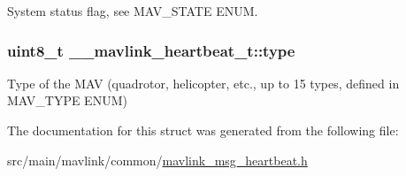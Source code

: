 System status flag, see M\+A\+V\+\_\+\+S\+T\+A\+T\+E E\+N\+U\+M. 

\hypertarget{struct____mavlink__heartbeat__t_a2f34a5f641022acd59d9b54e69976341}{
\subsubsection[{type}]{\setlength{\rightskip}{0pt plus 5cm}uint8\+\_\+t \+\_\+\+\_\+mavlink\+\_\+heartbeat\+\_\+t\+::type}}\label{struct____mavlink__heartbeat__t_a2f34a5f641022acd59d9b54e69976341}


Type of the M\+A\+V (quadrotor, helicopter, etc., up to 15 types, defined in M\+A\+V\+\_\+\+T\+Y\+P\+E E\+N\+U\+M) 



The documentation for this struct was generated from the following file\+:\begin{DoxyCompactItemize}
\item 
src/main/mavlink/common/\hyperlink{common_2mavlink__msg__heartbeat_8h}{mavlink\+\_\+msg\+\_\+heartbeat.\+h}\end{DoxyCompactItemize}

